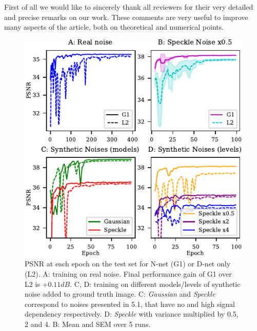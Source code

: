 \documentclass{article}
\begin{document}

First of all we would like to sincerely thank all reviewers for their very detailed and precise remarks on our work. These comments are very useful to improve many aspects of the article, both on theoretical and numerical points.
\begin{figure}[H]
\vskip -0.1in
\begin{center}
\includegraphics[width=\columnwidth]{fig_review.pdf}
\vskip -0.15in
\caption{PSNR at each epoch on the test set for N-net (G1) or D-net only (L2). A: training on real noise. Final performance gain of G1 over L2 is $+0.11dB$. C, D: training on different models/levels of synthetic noise added to ground truth image. C: \textit{Gaussian} and \textit{Speckle} correspond to noises presented in 5.1, that have no and high signal dependency respectively. D: \textit{Speckle} with variance multiplied by 0.5, 2 and 4. B: Mean and SEM over 5 runs.}
\label{fig:review}
\end{center}
\vskip -0.25in
\end{figure}
\end{document}
